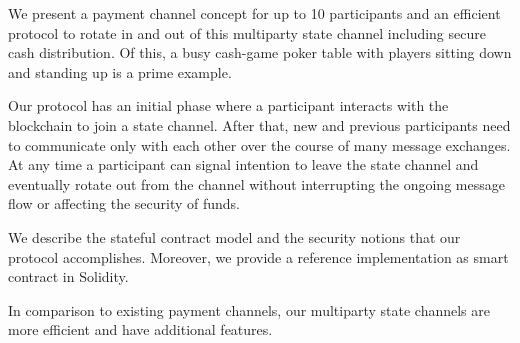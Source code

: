 We present a payment channel concept for up to 10 participants and an efficient protocol to rotate in and out of this multiparty state channel including secure cash distribution. Of this, a busy cash-game poker table with players sitting down and standing up is a prime example.
 
Our protocol has an initial phase where a participant interacts with the blockchain to join a state channel. After that, new and previous participants need to communicate only with each other over the course of many message exchanges. At any time a participant can signal intention to leave the state channel and eventually rotate out from the channel without interrupting the ongoing message flow or affecting the security of funds.
 
We describe the stateful contract model and the security notions that our protocol accomplishes. Moreover, we provide a reference implementation as smart contract in Solidity.

In comparison to existing payment channels, our multiparty state channels are more efficient and have additional features.
